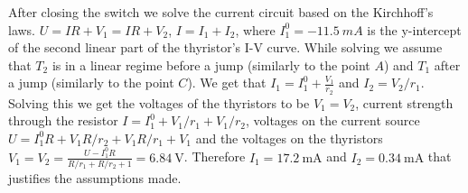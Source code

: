 {\begin{figure}[h]
\begin{center}
\end{center}
\end{figure}

After closing the switch we solve the current circuit based on the Kirchhoff’s laws. $U = IR + V_1 = IR + V_2$, $I = I_1 + I_2$, where $I_1^0=\SI{-11.5}{mA}$ is the y-intercept of the second linear part of the thyristor’s I-V curve. While solving we assume that $T_2$ is in a linear regime before a jump (similarly to the point $A$) and $T_1$ after a jump (similarly to the point $C$). We get that $I_1 = I_1^0 + \frac{V_1}{r_2}$ and $I_2 = V_2/r_1$. Solving this we get the voltages of the thyristors to be $V_1 = V_2$, current strength through the resistor $I = I_1^0 + V_1/r_1 + V_1/r_2$, voltages on the current source $U = I_1^0R + V_1R/r_2 + V_1R/r_1 + V_1$ and the voltages on the thyristors $V_1 = V_2 = \frac{U - I_1^0R}{R/r_1 + R/r_2 + 1} = \SI{6.84}{\volt}$. Therefore $I_1 = \SI{17.2}{\milli\ampere}$ and $I_2 = \SI{0.34}{\milli\ampere}$ that justifies the assumptions made.
\fi
}